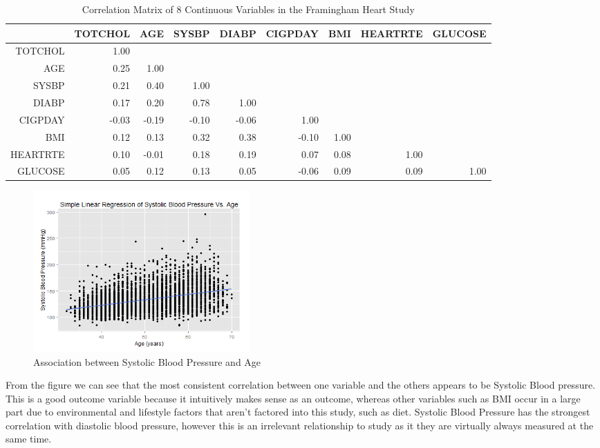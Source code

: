 \documentclass{article}\usepackage[]{graphicx}\usepackage[]{color}
\begin{document}
\begin{table}[h]
\centering
\begin{tabular}{rrrrrrrrr}
  \hline
 & TOTCHOL & AGE & SYSBP & DIABP & CIGPDAY & BMI & HEARTRTE & GLUCOSE \\ 
  \hline
TOTCHOL & 1.00 & & & & & & & \\ 
  AGE & 0.25 & 1.00 & & & & & & \\ 
  SYSBP & 0.21 & 0.40 & 1.00 & & & & & \\ 
  DIABP & 0.17 & 0.20 & 0.78 & 1.00 & & & & \\ 
  CIGPDAY & -0.03 & -0.19 & -0.10 & -0.06 & 1.00 & & & \\ 
  BMI & 0.12 & 0.13 & 0.32 & 0.38 & -0.10 & 1.00 & & \\ 
  HEARTRTE & 0.10 & -0.01 & 0.18 & 0.19 & 0.07 & 0.08 & 1.00 & \\ 
  GLUCOSE & 0.05 & 0.12 & 0.13 & 0.05 & -0.06 & 0.09 & 0.09 & 1.00 \\ 
   \hline
\end{tabular}
\caption{Correlation Matrix of 8 Continuous Variables in the Framingham Heart Study}
\end{table}

\begin{figure}
  \begin{center}
    \includegraphics[width=0.4\textwidth]{Rplot01.png}
  \end{center}
  \caption{Association between Systolic Blood Pressure and Age}
\end{figure}

From the figure we can see that the most consistent correlation between one variable and the others appears to be Systolic Blood pressure.  This is a good outcome variable because it intuitively makes sense as an outcome, whereas other variables such as BMI occur in a large part due to environmental and lifestyle factors that aren't factored into this study, such as diet. Systolic Blood Pressure has the strongest correlation with diastolic blood pressure, however this is an irrelevant relationship to study as it they are virtually always measured at the same time. 
\end{document}
